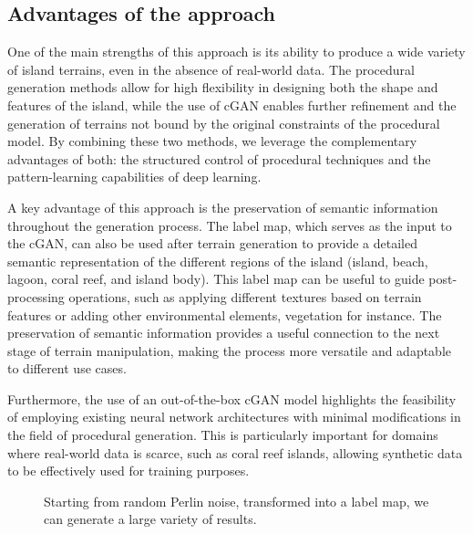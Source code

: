 \subsection{Advantages of the approach}
\label{sec:coral-island-advantages}

One of the main strengths of this approach is its ability to produce a wide variety of island terrains, even in the absence of real-world data. The procedural generation methods allow for high flexibility in designing both the shape and features of the island, while the use of cGAN enables further refinement and the generation of terrains not bound by the original constraints of the procedural model. By combining these two methods, we leverage the complementary advantages of both: the structured control of procedural techniques and the pattern-learning capabilities of deep learning.

A key advantage of this approach is the preservation of semantic information throughout the generation process. The label map, which serves as the input to the cGAN, can also be used after terrain generation to provide a detailed semantic representation of the different regions of the island (island, beach, lagoon, coral reef, and island body). This label map can be useful to guide post-processing operations, such as applying different textures based on terrain features or adding other environmental elements, vegetation for instance. The preservation of semantic information provides a useful connection to the next stage of terrain manipulation, making the process more versatile and adaptable to different use cases.

Furthermore, the use of an out-of-the-box cGAN model highlights the feasibility of employing existing neural network architectures with minimal modifications in the field of procedural generation. This is particularly important for domains where real-world data is scarce, such as coral reef islands, allowing synthetic data to be effectively used for training purposes.

\begin{figure}
    \caption{Starting from random Perlin noise, transformed into a label map, we can generate a large variety of results.}
    \label{fig:coral-island-perlin-examples}
\end{figure}

